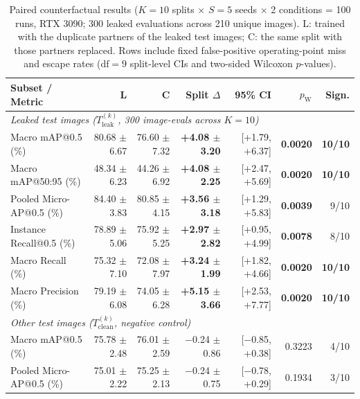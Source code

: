 \documentclass[pdflatex,sn-apa]{sn-jnl}
\begin{document}
\begin{table}[htbp]
\centering
\footnotesize
\setlength{\tabcolsep}{2.2pt}
\caption{Paired counterfactual results ($K=10$ splits $\times$ $S=5$ seeds $\times$ 2 conditions = 100 runs, RTX 3090; 300 leaked evaluations across 210 unique images). \textsf{L}: trained with the duplicate partners of the leaked test images; \textsf{C}: the same split with those partners replaced. Rows include fixed false-positive operating-point miss and escape rates ($\text{df}=9$ split-level CIs and two-sided Wilcoxon $p$-values).}
\label{tab:counterfactual_ablation}
\begin{tabular*}{\textwidth}{@{\extracolsep{\fill}} l r r r r r r}
\toprule
\textbf{Subset / Metric} & \textbf{\textsf{L}} & \textbf{\textsf{C}} & \textbf{Split $\Delta$} & \textbf{95\% CI} & \textbf{$p_{\text{W}}$} & \textbf{Sign.} \\
\midrule
\multicolumn{7}{l}{\textit{Leaked test images ($T_{\text{leak}}^{(k)}$, 300 image-evals across $K=10$)}} \\
Macro mAP@0.5 (\%) & 80.68 $\pm$ 6.67 & 76.60 $\pm$ 7.32 & \textbf{+4.08 $\pm$ 3.20} & [+1.79, +6.37] & \textbf{0.0020} & \textbf{10/10} \\
Macro mAP@50:95 (\%) & 48.34 $\pm$ 6.23 & 44.26 $\pm$ 6.92 & \textbf{+4.08 $\pm$ 2.25} & [+2.47, +5.69] & \textbf{0.0020} & \textbf{10/10} \\
Pooled Micro-AP@0.5 (\%) & 84.40 $\pm$ 3.83 & 80.85 $\pm$ 4.15 & \textbf{+3.56 $\pm$ 3.18} & [+1.29, +5.83] & \textbf{0.0039} & 9/10 \\
Instance Recall@0.5 (\%) & 78.89 $\pm$ 5.06 & 75.92 $\pm$ 5.25 & \textbf{+2.97 $\pm$ 2.82} & [+0.95, +4.99] & \textbf{0.0078} & 8/10 \\
Macro Recall (\%) & 75.32 $\pm$ 7.10 & 72.08 $\pm$ 7.97 & \textbf{+3.24 $\pm$ 1.99} & [+1.82, +4.66] & \textbf{0.0020} & \textbf{10/10} \\
Macro Precision (\%) & 79.19 $\pm$ 6.08 & 74.05 $\pm$ 6.28 & \textbf{+5.15 $\pm$ 3.66} & [+2.53, +7.77] & \textbf{0.0020} & \textbf{10/10} \\
\midrule
\multicolumn{7}{l}{\textit{Other test images ($T_{\text{clean}}^{(k)}$, negative control)}} \\
Macro mAP@0.5 (\%) & 75.78 $\pm$ 2.48 & 76.01 $\pm$ 2.59 & $-$0.24 $\pm$ 0.86 & [$-$0.85, +0.38] & 0.3223 & 4/10 \\
Pooled Micro-AP@0.5 (\%) & 75.01 $\pm$ 2.22 & 75.25 $\pm$ 2.13 & $-$0.24 $\pm$ 0.75 & [$-$0.78, +0.29] & 0.1934 & 3/10 \\

\end{tabular*}
\end{table}
\end{document}
